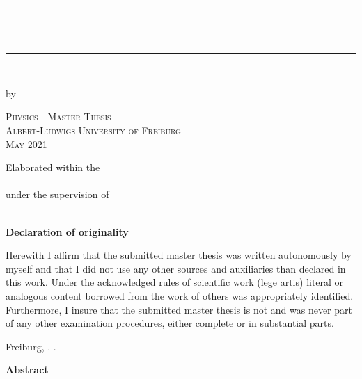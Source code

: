 \newcommand{\HRule}{\rule{\linewidth}{0.2mm}}

\begin{titlepage}	
	\begin{center}

		\HRule \\[0.8cm]
		{ \huge \bfseries \vtitle}\\[0.4cm]
		\HRule \\[0.4cm]

		\vspace{10pt}

		{ \Large by \vauthor }

		\vspace{120pt}
		
		\textsc{\Large Physics - Master Thesis\\[0.5cm] 
			Albert-Ludwigs University of Freiburg\\[0.5cm]
			May 2021\\[0.5cm]}

		\vspace{100pt}	

		\Large{	Elaborated within the\\ 
			\vinstitute\\
			\vspace{15pt}
			under the supervision of \\
 			\vsupervision\\}

	\end{center}
	\vspace{2cm}
\end{titlepage}
\newpage



\hspace{2cm}

{\Large\textbf{Declaration of originality}}\\

{\large Herewith I affirm that the submitted master thesis was written autonomously by myself and that I did not use any other sources and auxiliaries than declared in this work. Under the acknowledged rules of scientific work (lege artis) literal or analogous   content   borrowed   from   the   work   of   others   was appropriately identified. Furthermore, I insure that the submitted master thesis is not and was never part of any other examination procedures, either complete or in substantial parts.\par} 
\vspace{1.2cm}
\hspace{1.2cm} {\large Freiburg, } \underline{\hspace{0.6cm}} . \underline{\hspace{0.6cm}} . \underline{\hspace{1.2cm}}   \hfill \underline{\hspace{3.5cm}} \hspace{3cm}
\newpage


\mbox{}
\vspace{10pt}
\begin{center}
	\textbf{Abstract}\qquad
\end{center}
	\presummary


